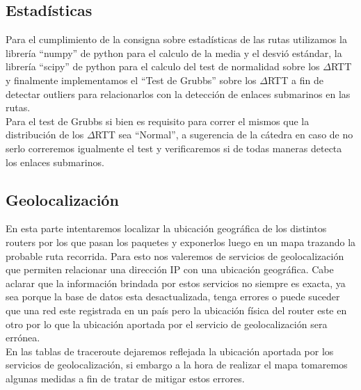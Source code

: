 \subsection{Estadísticas}\label{desarrollo:stats}

Para el cumplimiento de la consigna sobre estadísticas de las rutas utilizamos la librería ``numpy'' de python para el calculo de la media y el desvió estándar, la librería ``scipy'' de python para el calculo del test de normalidad sobre los $\Delta$RTT y finalmente implementamos el ``Test de Grubbs'' sobre los $\Delta$RTT a fin de detectar outliers para relacionarlos con la detección de enlaces submarinos en las rutas.\\
Para el test de Grubbs si bien es requisito para correr el mismos que la distribución de los $\Delta$RTT sea ``Normal'', a sugerencia de la cátedra en caso de no serlo correremos igualmente el test y verificaremos si de todas maneras detecta los enlaces submarinos.

\subsection{Geolocalización}

En esta parte intentaremos localizar la ubicación geográfica de los distintos routers por los que pasan los paquetes y exponerlos luego en un mapa trazando la probable ruta recorrida.
Para esto nos valeremos de servicios de geolocalización que permiten relacionar una dirección IP con una ubicación geográfica.
Cabe aclarar que la información brindada por estos servicios no siempre es exacta, ya sea porque la base de datos esta desactualizada, tenga errores o puede suceder que una red este registrada en un país pero la ubicación física del router este en otro por lo que la ubicación aportada por el servicio de geolocalización sera errónea.\\
En las tablas de traceroute dejaremos reflejada la ubicación aportada por los servicios de geolocalización, si embargo a la hora de realizar el mapa tomaremos algunas medidas a fin de tratar de mitigar estos errores.

